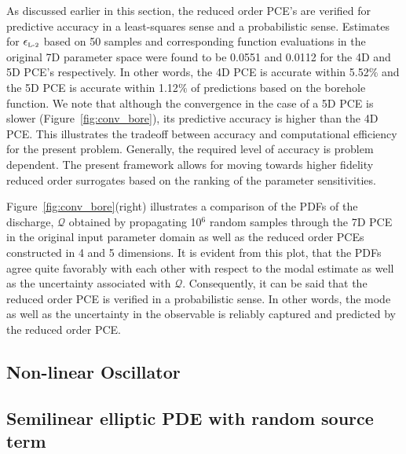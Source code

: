 As discussed earlier in this section, the reduced order PCE's are verified for
predictive accuracy in a least-squares sense and a probabilistic sense.
Estimates for $\epsilon_{\mbox{\tiny{L-2}}}$ based on 50 samples and
corresponding function evaluations in the original 7D parameter space were
found to be 0.0551 and 0.0112 for the 4D and 5D PCE's respectively. In other
words, the 4D PCE is accurate within 5.52$\%$ and the 5D PCE is accurate within
1.12$\%$ of predictions based on the borehole function. We note  that although
the convergence in the case of a 5D PCE is slower (Figure~\ref{fig:conv_bore}),
its predictive accuracy is higher than the 4D PCE. This illustrates the
tradeoff between accuracy and computational efficiency for the present 
problem. Generally, the required level of accuracy is problem dependent. 
The present framework allows for moving towards higher fidelity 
reduced order surrogates based on the ranking of the parameter sensitivities. 
 


Figure~\ref{fig:conv_bore}(right) illustrates a comparison of the PDFs
of the
discharge, $\mathcal{Q}$ obtained by propagating 10$^6$ random
samples through the 7D PCE in the original input parameter domain as well as
the reduced order PCEs constructed in 4 and 5 dimensions. 
It is evident from this plot, that the PDFs agree quite favorably with each
other with respect to the modal estimate as well as the uncertainty associated with 
$\mathcal{Q}$. 
Consequently, it can be said that the reduced order PCE is verified in a
probabilistic sense. In other words, the mode as well as the uncertainty in the
observable is reliably captured and predicted by the reduced order PCE. 
 
\subsection{Non-linear Oscillator}



\subsection{Semilinear elliptic PDE with random source term}

